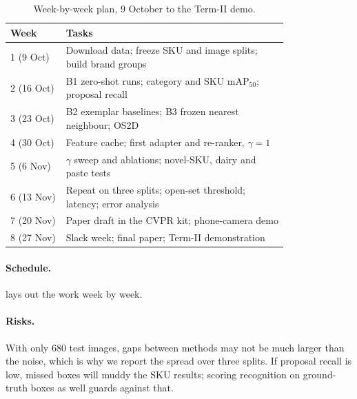 \documentclass[10pt,twocolumn,letterpaper]{article}
\begin{document}
\begin{table}[t]
  \centering
  \footnotesize
  \begin{tabular}{@{}lp{0.80\linewidth}@{}}
    \toprule
    Week & Tasks \\
    \midrule
    1 (9 Oct)  & Download data; freeze SKU and image splits; build brand groups \\
    2 (16 Oct) & B1 zero-shot runs; category and SKU mAP$_{50}$; proposal recall \\
    3 (23 Oct) & B2 exemplar baselines; B3 frozen nearest neighbour; OS2D \\
    4 (30 Oct) & Feature cache; first adapter and re-ranker, $\gamma=1$ \\
    5 (6 Nov)  & $\gamma$ sweep and ablations; novel-SKU, dairy and paste tests \\
    6 (13 Nov) & Repeat on three splits; open-set threshold; latency; error analysis \\
    7 (20 Nov) & Paper draft in the CVPR kit; phone-camera demo \\
    8 (27 Nov) & Slack week; final paper; Term-II demonstration \\
    \bottomrule
  \end{tabular}
  \caption{Week-by-week plan, 9 October to the Term-II demo.}
  \label{tab:plan}
\end{table}

\paragraph{Schedule.}  lays out the work week by week.

\paragraph{Risks.} With only 680 test images, gaps between methods may not be much larger than the noise, which is why we report the spread over three splits. If proposal recall is low, missed boxes will muddy the SKU results; scoring recognition on ground-truth boxes as well guards against that.

{\small


}
\end{document}
